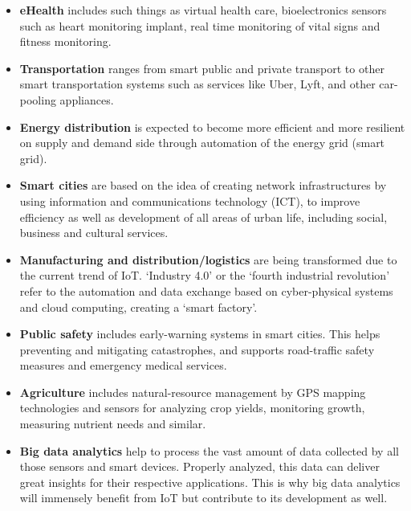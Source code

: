 		\begin{itemize}
			\item \textbf{eHealth} includes such things as virtual health care, bioelectronics sensors such as heart monitoring implant, real time monitoring of vital signs and fitness monitoring.

			\item \textbf{Transportation} ranges from smart public and private transport to other smart transportation systems such as services like Uber, Lyft, and other car-pooling appliances.

			\item \textbf{Energy distribution} is expected to become more efficient and more resilient on supply and demand side through automation of the energy grid (smart grid).

			\item \textbf{Smart cities} are based on the idea of creating network infrastructures by using information and communications technology (ICT), to improve efficiency as well as development of all areas of urban life, including social, business and cultural services.

			\item \textbf{Manufacturing and distribution/logistics} are being transformed due to the current trend of IoT. `Industry 4.0' or the `fourth industrial revolution' refer to the automation and data exchange based on cyber-physical systems and cloud computing, creating a `smart factory'.

			\item \textbf{Public safety} includes early-warning systems in smart cities. This helps preventing and mitigating catastrophes, and supports road-traffic safety measures and emergency medical services.

			\item \textbf{Agriculture} includes natural-resource management by GPS mapping technologies and sensors for analyzing crop yields, monitoring growth, measuring nutrient needs and similar. 

			\item \textbf{Big data analytics} help to process the vast amount of data collected by all those sensors and smart devices. Properly analyzed, this data can deliver great insights for their respective applications. This is why big data analytics will immensely benefit from IoT but contribute to its development as well.
		\end{itemize}
